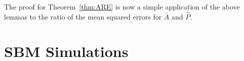 \documentclass[journal,twoside,web]{ieeecolor}
\newtheorem{theorem}[fact]{Theorem}
\begin{document}

The proof for Theorem~\ref{thm:ARE} is now a simple application of the above lemmas to the ratio of the mean squared errors for $\bar{A}$ and $\hat{P}$.


\section{SBM Simulations} \label{sec:sbm_sim}
\end{document}
